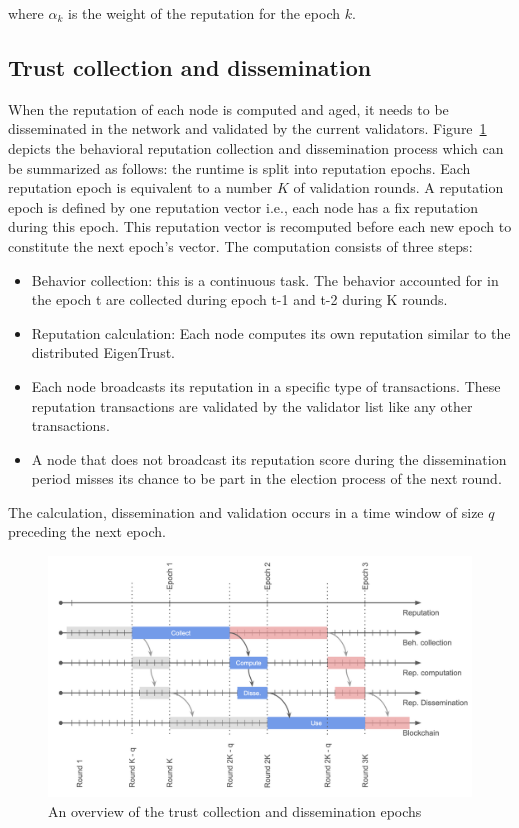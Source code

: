 \documentclass[]{article}
\begin{document}
where $\alpha_k$ is the weight of the reputation for the epoch $k$.  

\subsection{Trust collection and dissemination}
When the reputation of each node is computed and aged, it needs to be disseminated in the network and validated by the current validators. Figure~\ref{fig:disse} depicts the behavioral reputation collection and dissemination process which can be summarized as follows: the runtime is split into reputation epochs. Each reputation epoch is equivalent to a number $K$ of validation rounds. A reputation epoch is defined by one reputation vector i.e., each node has a fix reputation during this epoch. This reputation vector is recomputed before each new epoch to constitute the next epoch's vector. The computation consists of three steps:
\begin{itemize}
    \item Behavior collection: this is a continuous task. The behavior accounted for in the epoch t are collected during epoch t-1 and t-2 during K rounds.
    \item Reputation calculation: Each node computes its own reputation similar to the distributed EigenTrust.
    \item Each node broadcasts its reputation in a specific type of transactions. These reputation transactions are validated by the validator list like any other transactions.
    \item A node that does not broadcast its reputation score during the dissemination period misses its chance to be part in the election process of the next round.
\end{itemize}

The calculation, dissemination and validation occurs in a time window of size $q$ preceding the next epoch.


\begin{figure}[h]
\centering
	\includegraphics[width=\linewidth, trim= 0cm 0cm 0cm 0cm, clip]{Figures/synch.png}
	\caption{An overview of the trust collection and dissemination epochs}
	\label{fig:disse}
\end{figure}
\end{document}
